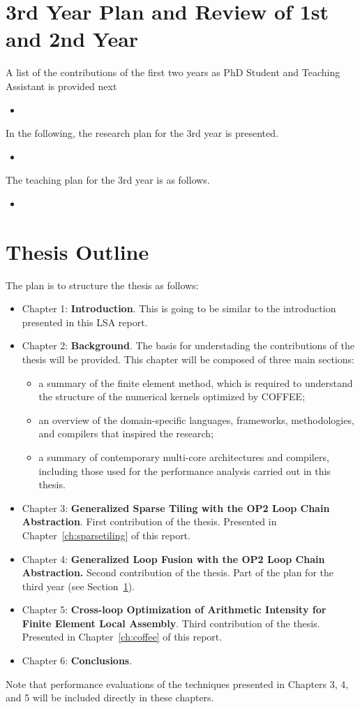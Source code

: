 \section{3rd Year Plan and Review of 1st and 2nd Year}
\label{sec:thirdyear}
A list of the contributions of the first two years as PhD Student and Teaching Assistant is provided next
\begin{itemize}
\item 
\end{itemize}

In the following, the research plan for the 3rd year is presented.
\begin{itemize}
\item 
\end{itemize}

The teaching plan for the 3rd year is as follows.
\begin{itemize}
\item 
\end{itemize}


\section{Thesis Outline}
The plan is to structure the thesis as follows:
\begin{itemize}
\item Chapter 1: \textbf{Introduction}. This is going to be similar to the introduction presented in this LSA report.
\item Chapter 2: \textbf{Background}. The basis for understading the contributions of the thesis will be provided. This chapter will be composed of three main sections:
\begin{itemize}
\item a summary of the finite element method, which is required to understand the structure of the numerical kernels optimized by COFFEE;
\item an overview of the domain-specific languages, frameworks, methodologies, and compilers that inspired the research;
\item a summary of contemporary multi-core architectures and compilers, including those used for the performance analysis carried out in this thesis.
\end{itemize}
\item Chapter 3: \textbf{Generalized Sparse Tiling with the OP2 Loop Chain Abstraction}. First contribution of the thesis. Presented in Chapter~\ref{ch:sparsetiling} of this report.
\item Chapter 4: \textbf{Generalized Loop Fusion with the OP2 Loop Chain Abstraction.} Second contribution of the thesis. Part of the plan for the third year (see Section~\ref{sec:thirdyear}).
\item Chapter 5: \textbf{Cross-loop Optimization of Arithmetic Intensity for Finite Element Local Assembly}. Third contribution of the thesis. Presented in Chapter~\ref{ch:coffee} of this report.
\item Chapter 6: \textbf{Conclusions}. 
\end{itemize}
Note that performance evaluations of the techniques presented in Chapters 3, 4, and 5 will be included directly in these chapters.